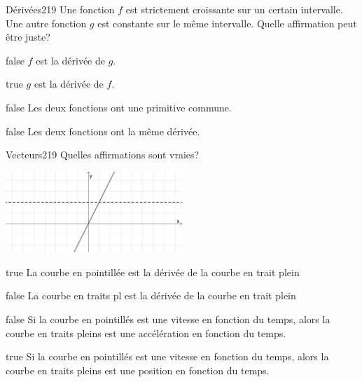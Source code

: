             \begin{question}{20}{Dérivées}{2}{19}
                Une fonction $f$ est strictement croissante sur un certain intervalle. Une autre fonction $g$ est constante sur le même intervalle. Quelle affirmation peut être juste?
            \end{question}
            \begin{reponses}
                \item[false] $f$ est la dérivée de $g$.
                \item[true] $g$ est la dérivée de $f$.
                \item[false] Les deux fonctions ont une primitive commune.
                \item[false] Les deux fonctions ont la même dérivée.
            \end{reponses}
            \begin{question}{20}{Vecteurs}{2}{19}
                Quelles affirmations sont vraies?
                \begin{center}
                	\includegraphics[width=0.5\textwidth]{Philippe/Figures_Philippe/d_riv_es_2_6.png}
                \end{center}
            \end{question}
            \begin{reponses}
                \item[true] La courbe en pointillée est la dérivée de la courbe en trait plein
                \item[false] La courbe en traits pl est la dérivée de la courbe en trait plein
                \item[false] Si la courbe en pointillés est une vitesse en fonction du temps, alors la courbe en traits pleins est une accélération en fonction du temps.
                \item[true] Si la courbe en pointillés est une vitesse en fonction du temps, alors la courbe en traits pleins est une position en fonction du temps.
            \end{reponses}

